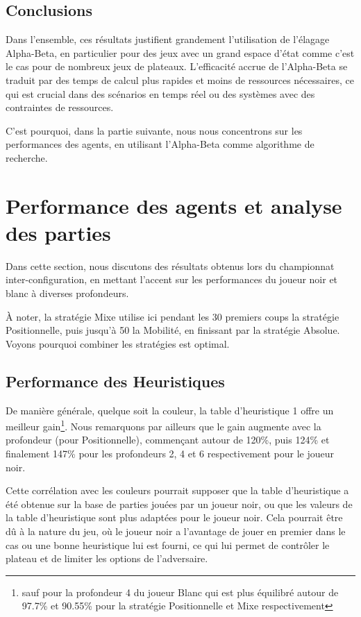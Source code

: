 \subsection*{Conclusions}

Dans l'ensemble, ces résultats justifient grandement l'utilisation de l'élagage Alpha-Beta, en particulier pour des jeux avec un grand espace d'état comme c'est le cas pour de nombreux jeux de plateaux. L'efficacité accrue de l'Alpha-Beta se traduit par des temps de calcul plus rapides et moins de ressources nécessaires, ce qui est crucial dans des scénarios en temps réel ou des systèmes avec des contraintes de ressources.

C'est pourquoi, dans la partie suivante, nous nous concentrons sur les performances des agents, en utilisant l'Alpha-Beta comme algorithme de recherche.

\pagebreak
\section{Performance des agents et analyse des parties}

Dans cette section, nous discutons des résultats obtenus lors du championnat inter-configuration, en mettant l'accent sur les performances du joueur noir et blanc à diverses profondeurs. 

À noter, la stratégie Mixe utilise ici pendant les 30 premiers coups la stratégie Positionnelle, puis jusqu'à 50 la Mobilité, en finissant par la stratégie Absolue. Voyons pourquoi combiner les stratégies est optimal.

\subsection{Performance des Heuristiques}

De manière générale, quelque soit la couleur, la table d'heuristique 1 offre un meilleur gain\footnote{sauf pour la profondeur 4 du joueur Blanc qui est plus équilibré autour de 97.7\% et 90.55\% pour la stratégie Positionnelle et Mixe respectivement}. Nous remarquons par ailleurs que le gain augmente avec la profondeur (pour Positionnelle), commençant autour de 120\%, puis 124\% et finalement 147\% pour les profondeurs 2, 4 et 6 respectivement pour le joueur noir.

Cette corrélation avec les couleurs pourrait supposer que la table d'heuristique a été obtenue sur la base de parties jouées par un joueur noir, ou que les valeurs de la table d'heuristique sont plus adaptées pour le joueur noir. Cela pourrait être dû à la nature du jeu, où le joueur noir a l'avantage de jouer en premier dans le cas ou une bonne heuristique lui est fourni, ce qui lui permet de contrôler le plateau et de limiter les options de l'adversaire.

